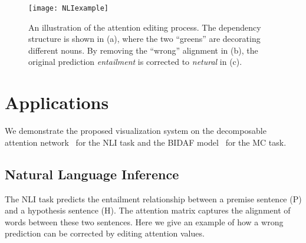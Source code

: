 \begin{figure*}[t]
\centering
\vspace{-2mm}
 \texttt{[image: NLIexample]}
  \vspace{-7mm}
 \caption{
An illustration of the attention editing process.
The dependency structure is shown in (a), where the two ``greens'' are decorating different nouns.
By removing the ``wrong'' alignment in (b), the original prediction \emph{entailment} is corrected to \emph{netural} in (c).
}
\vspace{-2mm}
\label{fig:NLIexample}
\end{figure*}

\section{Applications}
We demonstrate the proposed visualization system on the decomposable attention network~\cite{parikh2016emnlp}
for the NLI task and the BIDAF model~\cite{Seo2016} for the MC task.

\subsection{Natural Language Inference}
\label{sec:NLIexample}
The NLI task predicts the entailment relationship between a premise sentence (P) and a hypothesis sentence (H).
The attention matrix captures the alignment of words between these two sentences.
Here we give an example of how a wrong prediction can be corrected by editing attention values.  


